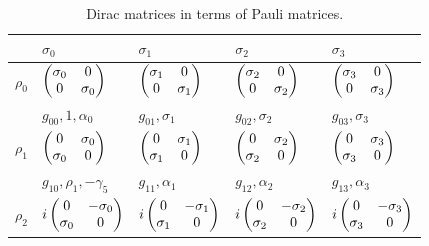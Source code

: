 \documentclass[10pt]{beamer}
\begin{document}
\begin{frame}[shrink=20]{}

\begin{table}[]
\centering
\caption{Dirac matrices in terms of Pauli matrices. }
\label{Dirac_Matrices_Pauli}
\begin{tabular}{l l  l  l  l }
\hline
& $\sigma_0$ & $\sigma_1$  & $\sigma_2$ & $\sigma_3$ \\
\hline
$\rho_0$ 
& $\begin{pmatrix}\sigma_0 & 0\cr 0 & \sigma_0\end{pmatrix}$  
& $\begin{pmatrix}\sigma_1 & 0\cr 0 & \sigma_1\end{pmatrix}$ 
& $\begin{pmatrix}\sigma_2 & 0\cr 0 & \sigma_2\end{pmatrix}$ 
& $\begin{pmatrix}\sigma_3 & 0\cr 0 & \sigma_3\end{pmatrix}$ 
\\
 & $g_{00}, 1, \alpha_0$ & $g_{01}, \sigma_1$  & $g_{02}, \sigma_2$ & $g_{03}, \sigma_3$ \\
\hline
$\rho_1$ 
&  $\begin{pmatrix} 0 & \sigma_0\cr \sigma_0 & 0\end{pmatrix}$ 
&  $\begin{pmatrix} 0 & \sigma_1\cr \sigma_1 & 0\end{pmatrix}$ 
&  $\begin{pmatrix} 0 & \sigma_2\cr \sigma_2 & 0\end{pmatrix}$ 
&  $\begin{pmatrix} 0 & \sigma_3\cr \sigma_3 & 0\end{pmatrix}$ 
 \\
& $g_{10}, \rho_1, -\gamma_5$  & $g_{11}, \alpha_1$  & $g_{12}, \alpha_2$ & $g_{13}, \alpha_3$ \\
\hline
$\rho_2$ 
&  $i \begin{pmatrix} 0 &- \sigma_0\cr \sigma_0 & 0\end{pmatrix}$ 
&  $i \begin{pmatrix} 0 & -\sigma_1\cr \sigma_1 & 0\end{pmatrix}$ 
&  $i \begin{pmatrix} 0 &- \sigma_2\cr \sigma_2 & 0\end{pmatrix}$ 
&  $i \begin{pmatrix} 0 &- \sigma_3\cr \sigma_3 & 0\end{pmatrix}$ 

\end{tabular}
\end{table}
\end{frame}
\end{document}
